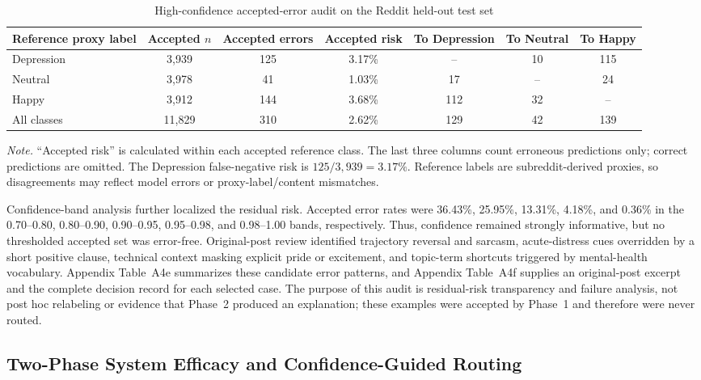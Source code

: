 \documentclass{ieeeaccess}
\begin{document}
\begin{table}[t]
\centering
\caption{High-confidence accepted-error audit on the Reddit held-out test set}
\label{tab:accepted-error-audit}
\footnotesize
\setlength{\tabcolsep}{4pt}
\renewcommand{\arraystretch}{1.16}
\begin{tabularx}{\textwidth}{@{}l c c c c c c@{}}
\toprule
Reference proxy label & Accepted $n$ & Accepted errors & Accepted risk & To Depression & To Neutral & To Happy \\
\midrule
Depression & 3,939 & 125 & 3.17\% & -- & 10 & 115 \\
Neutral & 3,978 & 41 & 1.03\% & 17 & -- & 24 \\
Happy & 3,912 & 144 & 3.68\% & 112 & 32 & -- \\
\midrule
All classes & 11,829 & 310 & 2.62\% & 129 & 42 & 139 \\
\bottomrule
\end{tabularx}
\vspace{2pt}
\parbox{\textwidth}{\footnotesize \textit{Note.} ``Accepted risk'' is calculated within each accepted reference class. The last three columns count erroneous predictions only; correct predictions are omitted. The Depression false-negative risk is $125/3{,}939=3.17\%$. Reference labels are subreddit-derived proxies, so disagreements may reflect model errors or proxy-label/content mismatches.}
\end{table}

Confidence-band analysis further localized the residual risk. Accepted error rates were 36.43\%, 25.95\%, 13.31\%, 4.18\%, and 0.36\% in the 0.70--0.80, 0.80--0.90, 0.90--0.95, 0.95--0.98, and 0.98--1.00 bands, respectively. Thus, confidence remained strongly informative, but no thresholded accepted set was error-free. Original-post review identified trajectory reversal and sarcasm, acute-distress cues overridden by a short positive clause, technical context masking explicit pride or excitement, and topic-term shortcuts triggered by mental-health vocabulary. Appendix Table~A4e summarizes these candidate error patterns, and Appendix Table~A4f supplies an original-post excerpt and the complete decision record for each selected case. The purpose of this audit is residual-risk transparency and failure analysis, not post hoc relabeling or evidence that Phase~2 produced an explanation; these examples were accepted by Phase~1 and therefore were never routed.

\subsection{Two-Phase System Efficacy and Confidence-Guided Routing}
\end{document}
